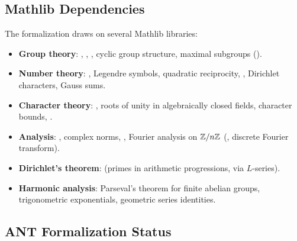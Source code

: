 \subsection{Mathlib Dependencies}

The formalization draws on several Mathlib libraries:
\begin{itemize}[nosep]
\item \textbf{Group theory}: , ,
  , cyclic group structure, maximal subgroups
  ().
\item \textbf{Number theory}: , Legendre symbols,
  quadratic reciprocity, , Dirichlet characters, Gauss sums.
\item \textbf{Character theory}: ,
  roots of unity in algebraically closed fields, character bounds,
  .
\item \textbf{Analysis}: , complex norms,
  , Fourier analysis on $\mathbb{Z}/n\mathbb{Z}$
  (, discrete Fourier transform).
\item \textbf{Dirichlet's theorem}: 
  (primes in arithmetic progressions, via $L$-series).
\item \textbf{Harmonic analysis}: Parseval's theorem for finite abelian
  groups, trigonometric exponentials, geometric series identities.
\end{itemize}

\subsection{ANT Formalization Status}
\label{sec:ant-formalization}

